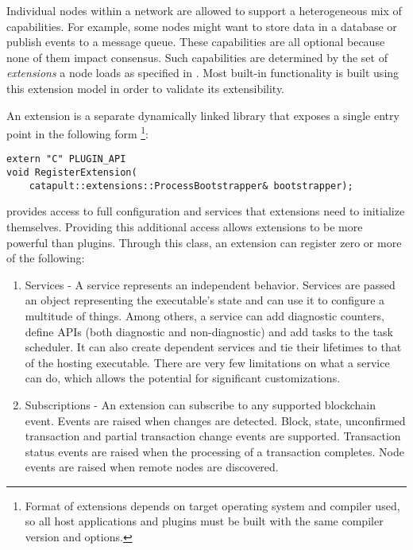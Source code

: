 Individual nodes within a network are allowed to support a heterogeneous mix of capabilities.
For example, some nodes might want to store data in a database or publish events to a message queue.
These capabilities are all optional because none of them impact consensus.
Such capabilities are determined by the set of \textit{extensions} a node loads as specified in .
Most built-in \codenamespace functionality is built using this extension model in order to validate its extensibility.

An extension is a separate dynamically linked library that exposes a single entry point in the following form
\footnote{Format of extensions depends on target operating system and compiler used, so all host applications and plugins must be built with the same compiler version and options.}:

\begin{lstlisting}
extern "C" PLUGIN_API
void RegisterExtension(
	catapult::extensions::ProcessBootstrapper& bootstrapper);
\end{lstlisting}

 provides access to full \codenamespace configuration and services that extensions need to initialize themselves.
Providing this additional access allows extensions to be more powerful than plugins.
Through this class, an extension can register zero or more of the following:

\begin{enumerate}
	\item{Services -
		A service represents an independent behavior.
		Services are passed an object representing the executable's state and can use it to configure a multitude of things.
		Among others, a service can add diagnostic counters, define APIs (both diagnostic and non-diagnostic) and add tasks to the task scheduler.
		It can also create dependent services and tie their lifetimes to that of the hosting executable.
		There are very few limitations on what a service can do, which allows the potential for significant customizations.
	}
	\item{Subscriptions -
		An extension can subscribe to any supported blockchain event.
		Events are raised when changes are detected.
		Block, state, unconfirmed transaction and partial transaction change events are supported.
		Transaction status events are raised when the processing of a transaction completes.
		Node events are raised when remote nodes are discovered.
	}
\end{enumerate}

